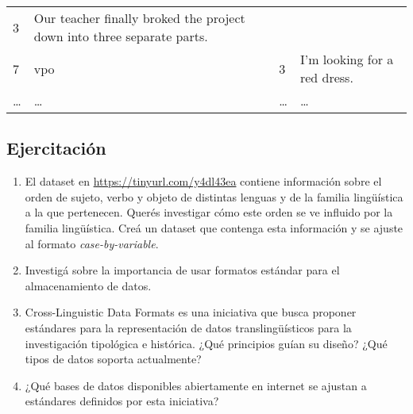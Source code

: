 \documentclass[12pt,spanish,a4paper,]{article}
\providecommand{\tightlist}{%
  \setlength{\itemsep}{0pt}\setlength{\parskip}{0pt}}
\begin{document}
\begin{longtable}[]{@{}llll@{}}
\begin{minipage}[t]{0.09\columnwidth}
3\strut
\end{minipage} & \begin{minipage}[t]{0.63\columnwidth}\raggedright
Our teacher finally broked the project down into three separate
parts.\strut
\end{minipage}\tabularnewline
\begin{minipage}[t]{0.08\columnwidth}\raggedright
7\strut
\end{minipage} & \begin{minipage}[t]{0.09\columnwidth}\raggedright
vpo\strut
\end{minipage} & \begin{minipage}[t]{0.09\columnwidth}\raggedright
3\strut
\end{minipage} & \begin{minipage}[t]{0.63\columnwidth}\raggedright
I'm looking for a red dress.\strut
\end{minipage}\tabularnewline
\begin{minipage}[t]{0.08\columnwidth}\raggedright
\ldots{}\strut
\end{minipage} & \begin{minipage}[t]{0.09\columnwidth}\raggedright
\ldots{}\strut
\end{minipage} & \begin{minipage}[t]{0.09\columnwidth}\raggedright
\ldots{}\strut
\end{minipage} & \begin{minipage}[t]{0.63\columnwidth}\raggedright
\ldots{}\strut
\end{minipage}\tabularnewline
\bottomrule
\end{longtable}

\hypertarget{ejercitacion-6}{%
\subsection{Ejercitación}\label{ejercitacion-6}}

\begin{enumerate}
\def\labelenumi{\arabic{enumi}.}
\tightlist
\item
  El dataset en \url{https://tinyurl.com/y4dl43ea} contiene información
  sobre el orden de sujeto, verbo y objeto de distintas lenguas y de la
  familia lingüística a la que pertenecen. Querés investigar cómo este
  orden se ve influido por la familia lingüística. Creá un dataset que
  contenga esta información y se ajuste al formato
  \emph{case-by-variable}.
\item
  Investigá sobre la importancia de usar formatos estándar para el
  almacenamiento de datos.
\item
  Cross-Linguistic Data Formats es una iniciativa que busca proponer
  estándares para la representación de datos translingüísticos para la
  investigación tipológica e histórica. ¿Qué principios guían su diseño?
  ¿Qué tipos de datos soporta actualmente?
\item
  ¿Qué bases de datos disponibles abiertamente en internet se ajustan a
  estándares definidos por esta iniciativa?
\end{enumerate}
\end{document}
